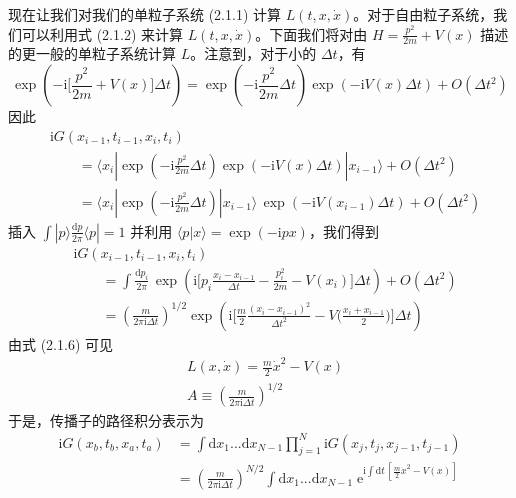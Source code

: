 现在让我们对我们的单粒子系统 (2.1.1) 计算 $L(t,x,\dot{x})$。对于自由粒子系统，我们可以利用式 (2.1.2) 来计算 $L(t,x,\dot{x})$。下面我们将对由 $H = \frac{p^2}{2m} + V(x)$ 描述的更一般的单粒子系统计算 $L$。注意到，对于小的 $\Delta t$，有
\begin{equation*}
\exp\left(-\mathrm{i}\Big[\frac{p^2}{2m} + V(x)\Big]\Delta t\right) = \exp\left(-\mathrm{i}\frac{p^2}{2m}\Delta t\right)\exp\left(-\mathrm{i}V(x)\Delta t\right) + O(\Delta t^2)
\end{equation*}
因此
\begin{align*}
&\mathrm{i}G(x_{i-1},t_{i-1},x_i,t_i)\\
&\qquad = \langle x_i| \exp\left(-\mathrm{i}\frac{p^2}{2m}\Delta t\right)\exp\left(-\mathrm{i}V(x)\Delta t\right) |x_{i-1}\rangle + O(\Delta t^2)\\
&\qquad = \langle x_i| \exp\left(-\mathrm{i}\frac{p^2}{2m}\Delta t\right) |x_{i-1}\rangle\, \exp\left(-\mathrm{i}V(x_{i-1})\Delta t\right) + O(\Delta t^2)
\end{align*}
插入 $\int |p\rangle \frac{\mathrm{d}p}{2\pi}\langle p| = 1$ 并利用 $\langle p|x\rangle = \exp(-\mathrm{i}px)$，我们得到
\begin{align*}
&\mathrm{i}G(x_{i-1},t_{i-1},x_i,t_i)\\
&\qquad = \int \frac{\mathrm{d}p_i}{2\pi}\, \exp\left(\mathrm{i}\big[p_i\frac{x_i-x_{i-1}}{\Delta t} - \frac{p_i^2}{2m} - V(x_i)\big]\Delta t\right) + O(\Delta t^2) \tag{2.1.7}\\
&\qquad = \left(\frac{m}{2\pi\mathrm{i}\Delta t}\right)^{1/2} \exp\left(\mathrm{i}\big[\frac{m}{2}\frac{(x_i-x_{i-1})^2}{\Delta t^2} - V\big(\frac{x_i+x_{i-1}}{2}\big)\big]\Delta t\right) \tag{2.1.8}
\end{align*}
由式 (2.1.6) 可见
\begin{align*}
&L(x,\dot{x}) = \frac{m}{2}\dot{x}^2 - V(x) \tag{2.1.9}\\
&A \equiv \left(\frac{m}{2\pi\mathrm{i}\Delta t}\right)^{1/2}
\end{align*}
于是，传播子的路径积分表示为
\begin{align*}
\mathrm{i}G(x_b,t_b,x_a,t_a) &= \int \mathrm{d}x_1...\mathrm{d}x_{N-1} \prod_{j=1}^{N} \mathrm{i}G(x_j,t_j,x_{j-1},t_{j-1})\\
&= \left(\frac{m}{2\pi\mathrm{i}\Delta t}\right)^{N/2} \int \mathrm{d}x_1...\mathrm{d}x_{N-1}\; \mathrm{e}^{\mathrm{i}\int \mathrm{d}t\,[\frac{m}{2}\dot{x}^2 - V(x)]} \tag{2.1.10}
\end{align*}

